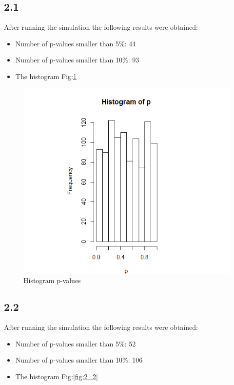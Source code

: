 \documentclass{article}
\begin{document}
    \subsection{2.1}
      After running the simulation the following results were obtained:
      \begin{itemize}
        \item Number of p-values smaller than 5\%: 44
        \item Number of p-values smaller than 10\%: 93
        \item The histogram Fig:\ref{fig:2_1}
      \end{itemize}

      \begin{figure}
        \centering
        \includegraphics[width=.8\linewidth]{results/2_1}
        \caption{Histogram p-values}
        \label{fig:2_1}
      \end{figure}

    \subsection{2.2}
      After running the simulation the following results were obtained:
      \begin{itemize}
        \item Number of p-values smaller than 5\%: 52
        \item Number of p-values smaller than 10\%: 106
        \item The histogram Fig:\ref{fig:2_2}
      \end{itemize}
      
\end{document}
